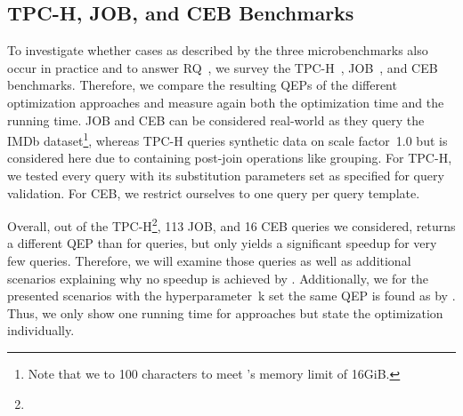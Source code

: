 

\subsection{TPC-H, JOB, and CEB Benchmarks}
\label{sec:eval-real_world_benchmarks}

To investigate whether cases as described by the three microbenchmarks also occur in practice and to answer RQ~, we survey the TPC-H~\cite{tpch}, JOB~, and CEB~ benchmarks.  Therefore, we compare the resulting QEPs of the different optimization approaches and measure again both the optimization time and the running time.  JOB and CEB can be considered real-world as they query the IMDb dataset\footnote{Note that we  to 100 characters to meet \mutable's memory limit of 16GiB.}, whereas TPC-H queries synthetic data on scale factor~1.0 but is considered here due to containing post-join operations like grouping.  For TPC-H, we tested every query with its substitution parameters set as specified for query validation.  For CEB, we restrict ourselves to one query per query template.


Overall, out of the  TPC-H\footnote{}, 113 JOB, and 16 CEB queries we considered, \holistic returns a different QEP than \split for  queries, but only yields a significant speedup for very few queries.  Therefore, we will examine those queries as well as additional scenarios explaining why no speedup is achieved by \holistic.  Additionally, we   \topk for the presented scenarios with the hyperparameter~k set \sut the same QEP is found as by \holistic.  Thus, we only show one running time for  approaches but state the optimization  individually.

